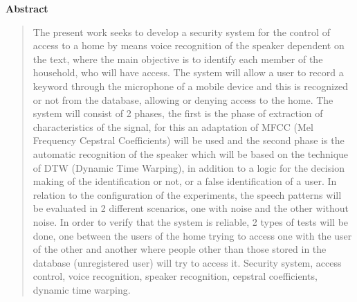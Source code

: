 \newpage
\begin{center}
 {\bf\LARGE Abstract}
\end{center} 
\begin{quotation}
The present work seeks to develop a security system for the control of access to a home by means voice recognition of the speaker dependent on the text, where the main objective is to identify each member of the household, who will have access. The system will allow a user to record a keyword through the microphone of a mobile device and this is recognized or not from the database, allowing or denying access to the home. The system will consist of 2 phases, the first is the phase of extraction of characteristics of the signal, for this an adaptation of MFCC (Mel Frequency Cepstral Coefficients) will be used and the second phase is the automatic recognition of the speaker which will be based on the technique of DTW (Dynamic Time Warping), in addition to a logic for the decision making of the identification or not, or a false identification of a user. In relation to the configuration of the experiments, the speech patterns will be evaluated in 2 different scenarios, one with noise and the other without noise. In order to verify that the system is reliable, 2 types of tests will be done, one between the users of the home trying to access one with the user of the other and another where people other than those stored in the database (unregistered user) will try to access it. 
\vskip 0.25cm
\hspace*{-0.6cm}{\bf Keywords:} 
Security system, access control, voice recognition, speaker recognition, cepstral coefficients, dynamic time warping.
\end{quotation}


